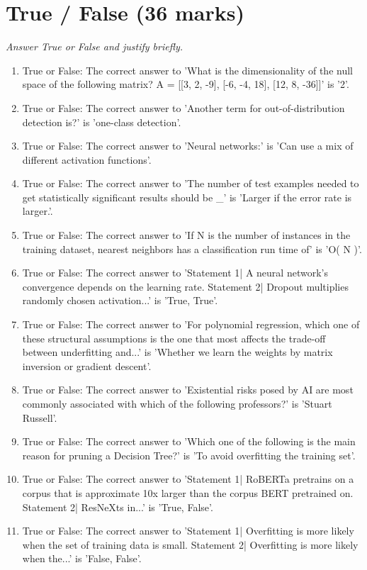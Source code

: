 \documentclass[12pt]{article}
\begin{document}
\section*{True / False (36 marks)}
\textit{Answer True or False and justify briefly.}
\begin{enumerate}[label=\arabic*.]
\item True or False: The correct answer to 'What is the dimensionality of the null space of the following matrix? A = [[3, 2, -9], [-6, -4, 18], [12, 8, -36]]' is '2'.
\item True or False: The correct answer to 'Another term for out-of-distribution detection is?' is 'one-class detection'.
\item True or False: The correct answer to 'Neural networks:' is 'Can use a mix of different activation functions'.
\item True or False: The correct answer to 'The number of test examples needed to get statistically significant results should be \_' is 'Larger if the error rate is larger.'.
\item True or False: The correct answer to 'If N is the number of instances in the training dataset, nearest neighbors has a classification run time of' is 'O( N )'.
\item True or False: The correct answer to 'Statement 1| A neural network's convergence depends on the learning rate. Statement 2| Dropout multiplies randomly chosen activation...' is 'True, True'.
\item True or False: The correct answer to 'For polynomial regression, which one of these structural assumptions is the one that most affects the trade-off between underfitting and...' is 'Whether we learn the weights by matrix inversion or gradient descent'.
\item True or False: The correct answer to 'Existential risks posed by AI are most commonly associated with which of the following professors?' is 'Stuart Russell'.
\item True or False: The correct answer to 'Which one of the following is the main reason for pruning a Decision Tree?' is 'To avoid overfitting the training set'.
\item True or False: The correct answer to 'Statement 1| RoBERTa pretrains on a corpus that is approximate 10x larger than the corpus BERT pretrained on. Statement 2| ResNeXts in...' is 'True, False'.
\item True or False: The correct answer to 'Statement 1| Overfitting is more likely when the set of training data is small. Statement 2| Overfitting is more likely when the...' is 'False, False'.

\end{enumerate}
\end{document}
